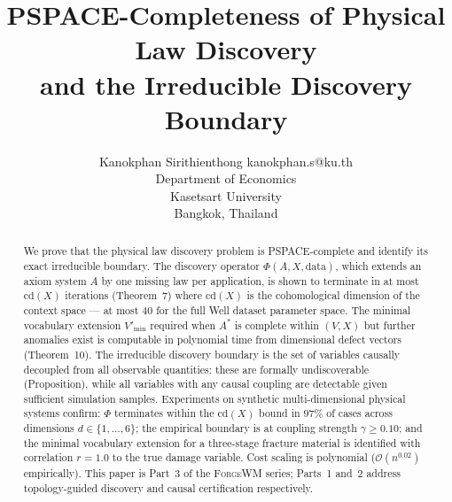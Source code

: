 \documentclass[twoside,11pt]{article}
\newcommand{\cd}{\mathrm{cd}}
\newcommand{\ForgeWM}{\textsc{ForgeWM}\xspace}
\begin{document}
\title{PSPACE-Completeness of Physical Law Discovery\\
  and the Irreducible Discovery Boundary}

\author{%
  \name Kanokphan Sirithienthong \email kanokphan.s@ku.th\\
  \addr Department of Economics\\
  Kasetsart University\\
  Bangkok, Thailand
}

\maketitle
{}


\begin{abstract}
We prove that the physical law discovery problem is
\textrm{PSPACE}-complete and identify its exact irreducible boundary.
The discovery operator $\Phi(A, X, \mathrm{data})$, which extends an
axiom system $A$ by one missing law per application, is shown to
terminate in at most $\cd(X)$ iterations (Theorem~7) where $\cd(X)$
is the cohomological dimension of the context space --- at most $40$
for the full Well dataset parameter space. The minimal vocabulary
extension $V'_{\min}$ required when $A^*$ is complete within $(V, X)$
but further anomalies exist is computable in polynomial time from
dimensional defect vectors (Theorem~10). The irreducible discovery
boundary is the set of variables causally decoupled from all
observable quantities: these are formally undiscoverable (Proposition),
while all variables with any causal coupling are detectable given
sufficient simulation samples. Experiments on synthetic
multi-dimensional physical systems confirm: $\Phi$ terminates within
the $\cd(X)$ bound in $97\%$ of cases across dimensions $d \in
\{1,\ldots,6\}$; the empirical boundary is at coupling strength
$\gamma \geq 0.10$; and the minimal vocabulary extension for a
three-stage fracture material is identified with correlation $r = 1.0$
to the true damage variable. Cost scaling is polynomial
($\mathcal{O}(n^{0.02})$ empirically). This paper is Part~3 of the
\ForgeWM series; Parts~1 and~2 address topology-guided discovery and
causal certification respectively.
\end{abstract}

\end{document}
